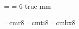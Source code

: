 


\magnification= 
\parskip=0pt
\baselineskip= 6 true mm
\hsize 5.25in


\font\smallrm=cmr8
\font\smallit=cmti8
\font\smallbf=cmbx8
\def\a{\alpha}
\def\b{\beta}
\def\g{\gamma} \def\G{\Gamma}
\def\d{\delta} \def\D{\Delta}
\def\e{\varepsilon}
\def\h{\eta}
\def\k{\kappa}
\def\l{\lambda} \def\L{\Lambda}
\def\m{\mu}
\def\f{\phi} \def\F{\Phi}
\def\n{\nu}
\def\j{\psi} \def\J{\Psi}
\def\r{\rho}
\def\s{\sigma} \def\S{\Sigma}
\def\t{\tau}
\def\th{\theta} \def\thh{\vartheta} \def\Th{\Theta}
\def\x{\xi} \def\X{\Xi}
\def\ch{\chi}
\def\w{\omega} \def\W{\Omega}
\def\v{\varphi}
\def\z{\zeta}
\def\om{\omega}
\def\slash{\llap /}
\def\Lagr{{\cal L}}
\def\pa{\partial}
\def\ddt{{{\rm d}\over{\rm d}t}}
\def\o{\over}
\def\Hin{{\rm {\cal H}_{in}^{BH}}}
\def\Hout{{\rm {\cal H}_{out}^{WH}}}

\def\today{September 27, 1993}

\def\thedate#1{\rightline{#1}}

